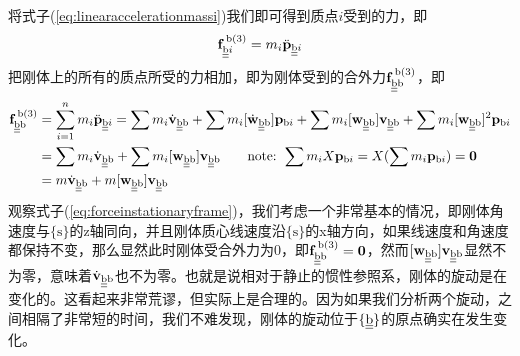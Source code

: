 \documentclass[12pt, a4paper, article, UTF8]{ctexart}
\begin{document}
将式子(\ref{eq:linearaccelerationmassi})我们即可得到质点$i$受到的力，即
\begin{align}
\mathbf{f}^{\,\text{b}(3)}_{\text{\underline{\underline{b}}}i} = m_i \ddot{\mathbf{p}}_{\text{\underline{\underline{b}}}i} \label{eq:fmastationaryframe}
\end{align}
把刚体上的所有的质点所受的力相加，即为刚体受到的合外力$\mathbf{f}^{\,\text{b}(3)}_\text{\underline{\underline{b}}b}$，即
\begin{align}
\mathbf{f}^{\,\text{b}(3)}_\text{\underline{\underline{b}}b} &= \sum^n_{i=1} m_i \ddot{\mathbf{p}}_{\text{\underline{\underline{b}}}i}  = \sum m_i \dot{\mathbf{v}}_{\text{\underline{\underline{b}}b}} + \sum m_i [\dot{\mathbf{w}}_{\text{\underline{\underline{b}}b}}] \mathbf{p}_{\text{b}i} + \sum m_i [\mathbf{w}_{\text{\underline{\underline{b}}b}} ] \mathbf{v}_{\text{\underline{\underline{b}}b}} + \sum m_i [\mathbf{w}_{\text{\underline{\underline{b}}b}} ]^2 \mathbf{p}_{\text{b}i} \nonumber \\ 
& = \sum m_i \dot{\mathbf{v}}_{\text{\underline{\underline{b}}b}} + \sum m_i [\mathbf{w}_{\text{\underline{\underline{b}}b}} ] \mathbf{v}_{\text{\underline{\underline{b}}b}} \quad \quad \text{note: } \sum m_i X \mathbf{p}_{\text{b}i} = X(\sum m_i \mathbf{p}_{\text{b}i}) = \mathbf{0}  \nonumber \\
&= m \dot{\mathbf{v}}_{\text{\underline{\underline{b}}b}} + m [\mathbf{w}_{\text{\underline{\underline{b}}b}} ] \mathbf{v}_{\text{\underline{\underline{b}}b}} \label{eq:forceinstationaryframe}
\end{align}
观察式子(\ref{eq:forceinstationaryframe})，我们考虑一个非常基本的情况，即刚体角速度与$\{\text{s}\}$的z轴同向，并且刚体质心线速度沿$\{\text{s}\}$的x轴方向，如果线速度和角速度都保持不变，那么显然此时刚体受合外力为0，即$\mathbf{f}^{\,\text{b}(3)}_\text{\underline{\underline{b}}b} = \mathbf{0}$，然而$[\mathbf{w}_{\text{\underline{\underline{b}}b}} ] \mathbf{v}_{\text{\underline{\underline{b}}b}}$显然不为零，意味着$\dot{\mathbf{v}}_{\text{\underline{\underline{b}}b}}$也不为零。也就是说相对于静止的惯性参照系，刚体的旋动是在变化的。这看起来非常荒谬，但实际上是合理的。因为如果我们分析两个旋动，之间相隔了非常短的时间，我们不难发现，刚体的旋动位于$\{\text{\underline{\underline{b}}}\}$的原点确实在发生变化。
\end{document}
